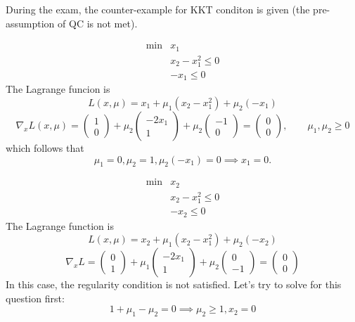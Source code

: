 During the exam, the counter-example for KKT conditon is given (the pre-assumption of QC is not met).
\begin{example}
\[
\begin{array}{ll}
\min&x_1\\
&x_2-x_1^2\le0\\
&-x_1\le0
\end{array}
\]
The Lagrange funcion is
\[
L(x,\mu)=x_1+\mu_1(x_2-x_1^2)+\mu_2(-x_1)
\]
\[
\nabla_xL(x,\mu)=\begin{pmatrix}
1\\0
\end{pmatrix}+\mu_2\begin{pmatrix}
-2x_1\\1
\end{pmatrix}+\mu_2\begin{pmatrix}
-1\\0
\end{pmatrix}=\begin{pmatrix}
0\\0
\end{pmatrix},\qquad \mu_1,\mu_2\ge0
\]
which follows that
\[
\mu_1=0,\mu_2=1,\mu_2(-x_1)=0\implies x_1=0.
\]
\end{example}
\begin{example}
\[
\begin{array}{ll}
\min&x_2\\
&x_2-x_1^2\le0\\
&-x_2\le0
\end{array}
\]
The Lagrange function is 
\[
L(x,\mu)=x_2+\mu_1(x_2-x_1^2)+\mu_2(-x_2)
\]
\[
\nabla_xL=\begin{pmatrix}
0\\1
\end{pmatrix}+\mu_1\begin{pmatrix}
-2x_1\\1
\end{pmatrix}+\mu_2\begin{pmatrix}
0\\-1
\end{pmatrix}=\begin{pmatrix}
0\\0
\end{pmatrix}
\]
In this case, the regularity condition is not satisfied. Let's try to solve for this question first:
\[
1+\mu_1-\mu_2=0\implies
\mu_2\ge1,x_2=0
\]
\end{example}

















